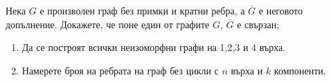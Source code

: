 \begin{problem}
  Нека $G$ е произволен граф без примки и кратни ребра, а $\overline{G}$ е неговото допълнение.
  Докажете, че поне един от графите $G$, $\overline{G}$ е свързан;
\end{problem}


\begin{problem}
  \begin{enumerate}
  \item
    Да се построят всички неизоморфни графи на 1,2,3 и 4 върха.
  \item
    Намерете броя на ребрата на граф без цикли с $n$ върха и $k$ компоненти.
  \end{enumerate}
\end{problem}
